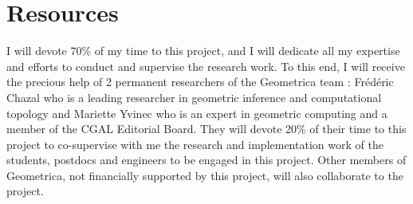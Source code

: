 








\section{Resources}

I will devote 70\% of my time to this project, and I will dedicate all my expertise and efforts to conduct and supervise the research work. To this end, I will receive the precious help of 2 permanent researchers of the Geometrica team : Fr\'ed\'eric Chazal who is a  leading researcher in geometric inference and computational topology and Mariette Yvinec who is an expert in geometric computing and a member of the CGAL Editorial Board. They will devote 20\% of their time to this project to co-supervise with me the research and implementation work of the students, postdocs and engineers to be engaged in this project. Other members of Geometrica,
not financially supported by this project, will also collaborate to the project.


